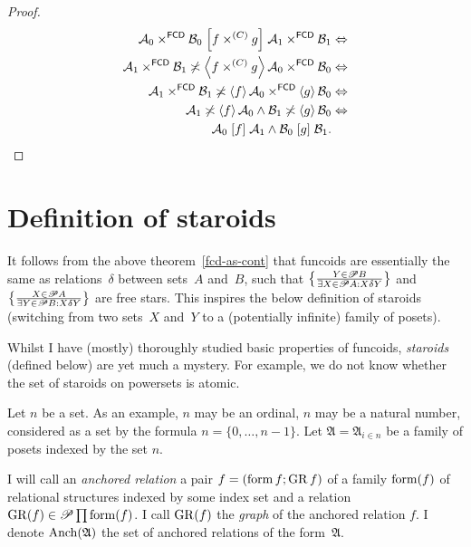 \begin{proof}
~
\begin{align*}
\mathcal{A}_{0}\times^{\mathsf{FCD}}\mathcal{B}_{0}\mathrel{\left[f\times^{(C)}g\right]}\mathcal{A}_{1}\times^{\mathsf{FCD}}\mathcal{B}_{1} & \Leftrightarrow\\
\mathcal{A}_{1}\times^{\mathsf{FCD}}\mathcal{B}_{1}\not\asymp\left\langle f\times^{(C)}g\right\rangle\mathcal{A}_{0}\times^{\mathsf{FCD}}\mathcal{B}_{0} & \Leftrightarrow\\
\mathcal{A}_{1}\times^{\mathsf{FCD}}\mathcal{B}_{1}\not\asymp\left\langle f\right\rangle\mathcal{A}_{0}\times^{\mathsf{FCD}}\left\langle g\right\rangle\mathcal{B}_{0} & \Leftrightarrow\\
\mathcal{A}_{1}\not\asymp\left\langle f\right\rangle\mathcal{A}_{0}\land\mathcal{B}_{1}\not\asymp\left\langle g\right\rangle\mathcal{B}_{0} & \Leftrightarrow\\
\mathcal{A}_{0}\mathrel{\left[f\right]}\mathcal{A}_{1}\wedge\mathcal{B}_{0}\mathrel{\left[g\right]}\mathcal{B}_{1}.
\end{align*}

\end{proof}

\section{Definition of staroids}

It follows from the above theorem~\ref{fcd-as-cont} that funcoids
are essentially the same as relations~$\delta$ between sets~$A$
and~$B$, such that $\left\{ \frac{Y\in\mathscr{P} B}{\exists X\in\mathscr{P} A:X\mathrel{\delta}Y}\right\}$
and $\left\{ \frac{X\in\mathscr{P} A}{\exists Y\in\mathscr{P} B:X\mathrel{\delta}Y}\right\}$
are free stars. This inspires the below definition of staroids (switching
from two sets~$X$ and~$Y$ to a (potentially infinite) family of
posets).

Whilst I have (mostly) thoroughly studied basic properties of funcoids,
\emph{staroids} (defined below) are yet much a mystery. For example,
we do not know whether the set of staroids on powersets is atomic.

Let $n$ be a set. As an example, $n$ may be an ordinal, $n$ may
be a natural number, considered as a set by the formula $n=\{0,\ldots,n-1\}$.
Let $\mathfrak{A}=\mathfrak{A}_{i\in n}$ be a family of posets indexed
by the set $n$.
\begin{defn}
I will
call an \emph{anchored relation} a pair $f=(\operatorname{form} f;\operatorname{GR} f)$ of a
family $\operatorname{form}(f)$ of relational structures indexed by some index
set and a relation $\operatorname{GR}(f)\in\mathscr{P}\prod\operatorname{form}(f)$. I call $\operatorname{GR}(f)$
the \emph{graph} of the anchored relation $f$. I denote $\operatorname{Anch}(\mathfrak{A})$
the set of anchored relations of the form~$\mathfrak{A}$.
\end{defn}

